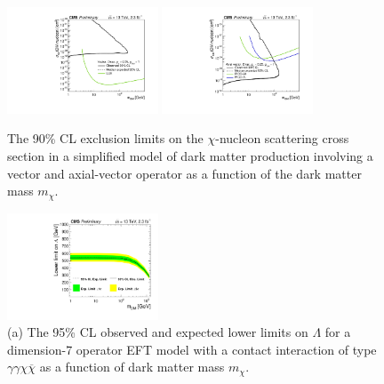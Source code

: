 \begin{figure}[htb!]
\caption[Exclusion limits on DM-nucleon cross section]{The 90\% CL exclusion limits on the $\chi$-nucleon scattering cross section in a simplified model of dark matter production involving a vector and axial-vector operator as a function of the dark matter mass $m_{\chi}$.}\label{fig:cont}
\begin{center}
\includegraphics[width=0.4\textwidth]{pdfs/lgxc/fromb/SI.pdf}
\includegraphics[width=0.4\textwidth]{pdfs/lgxc/fromb/SD.pdf}
\end{center}
\end{figure}

\begin{figure}[htb!]
\caption[Expected lower limit for EFT cutoff parameter $\Lambda$]{(a) The 95\% CL observed and expected lower limits on $\Lambda$ for a dimension-7 operator EFT model with a contact interaction of type $\gamma\gamma\chi\overline{\chi}$ as a function of dark matter mass $m_{\chi}$.}\label{fig:DMEWKlimits}
\begin{center}
\includegraphics[width=0.4\textwidth]{pdfs/lgxc/fromb/EWK_lambda.pdf}
\end{center}
\end{figure}





